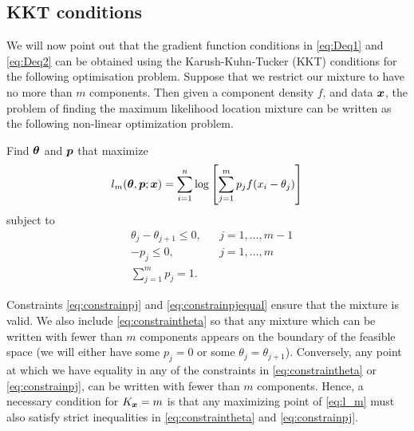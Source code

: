 	\subsection{KKT conditions}
	We will now point out that the gradient function conditions in \eqref{eq:Deq1} and \eqref{eq:Deq2} can be obtained using the Karush-Kuhn-Tucker (KKT) conditions \cite{Kuhn1951-ih} \cite{Karush2014-vk} for the following optimisation problem. Suppose that we restrict our mixture to have no more than $m$ components. Then given a component density $f$, and data ${\bm{{x}}}$, the problem of finding the maximum likelihood location mixture can be written as the following non-linear optimization problem.

	Find ${\bm{{\theta}}}$ and ${\bm{{p}}}$ that maximize
	\begin{equation}
		l_m({\bm{{\theta}}},{\bm{{p}}};{\bm{{x}}}) = \sum_{i=1}^n \log \left[\sum_{j=1}^m p_j f(x_i - \theta_j) \right]
		\label{eq:l_m}
	\end{equation}
	subject to 
	\begin{align}
		&\theta_j -\theta_{j+1} \leq 0, &&j=1,\dots,m-1
		\label{eq:constraintheta}\\
		&-p_j \leq 0, &&j=1,\dots,m
		\label{eq:constrainpj}\\
		&\sum_{j=1}^m p_j = 1.
		\label{eq:constrainpjequal}
	\end{align}

	Constraints \eqref{eq:constrainpj} and \eqref{eq:constrainpjequal} ensure that the mixture is valid. We also include \eqref{eq:constraintheta} so that any mixture which can be written with fewer than $m$ components appears on the boundary of the feasible space (we will either have some $p_j = 0$ or some $\theta_j = \theta_{j+1}$). Conversely, any point at which we have equality in any of the constraints in \eqref{eq:constraintheta} or \eqref{eq:constrainpj}, can be written with fewer than $m$ components. Hence, a necessary condition for $K_{\bm{{x}}} = m$ is that any maximizing point of \eqref{eq:l_m} must also satisfy strict inequalities in \eqref{eq:constraintheta} and \eqref{eq:constrainpj}.

